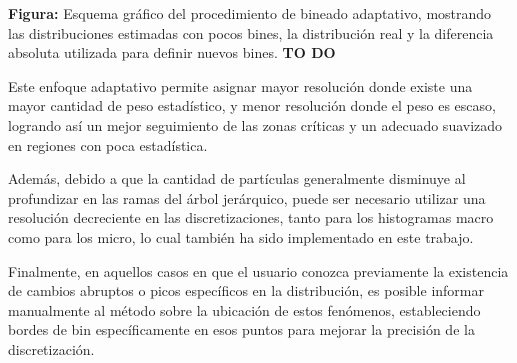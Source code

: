 \textbf{Figura:} Esquema gráfico del procedimiento de bineado adaptativo, mostrando las distribuciones estimadas con pocos bines, la distribución real y la diferencia absoluta utilizada para definir nuevos bines. \textbf{TO DO}

Este enfoque adaptativo permite asignar mayor resolución donde existe una mayor cantidad de peso estadístico, y menor resolución donde el peso es escaso, logrando así un mejor seguimiento de las zonas críticas y un adecuado suavizado en regiones con poca estadística.

Además, debido a que la cantidad de partículas generalmente disminuye al profundizar en las ramas del árbol jerárquico, puede ser necesario utilizar una resolución decreciente en las discretizaciones, tanto para los histogramas macro como para los micro, lo cual también ha sido implementado en este trabajo.

Finalmente, en aquellos casos en que el usuario conozca previamente la existencia de cambios abruptos o picos específicos en la distribución, es posible informar manualmente al método sobre la ubicación de estos fenómenos, estableciendo bordes de bin específicamente en esos puntos para mejorar la precisión de la discretización.







